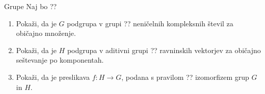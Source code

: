 \begin{frame}{Grupe}
	Naj bo
	??
	\begin{enumerate}
		\item
			Pokaži, da je $G$ podgrupa v grupi ??
			neničelnih kompleksnih števil za običajno množenje.
		\item
			Pokaži, da je $H$ podgrupa v aditivni grupi ??
			ravninskih vektorjev za običajno seštevanje po komponentah.
		\item
			Pokaži, da je preslikava $f:H\to G$, podana s pravilom
			??
			izomorfizem grup $G$ in $H$.
	\end{enumerate}
\end{frame}

